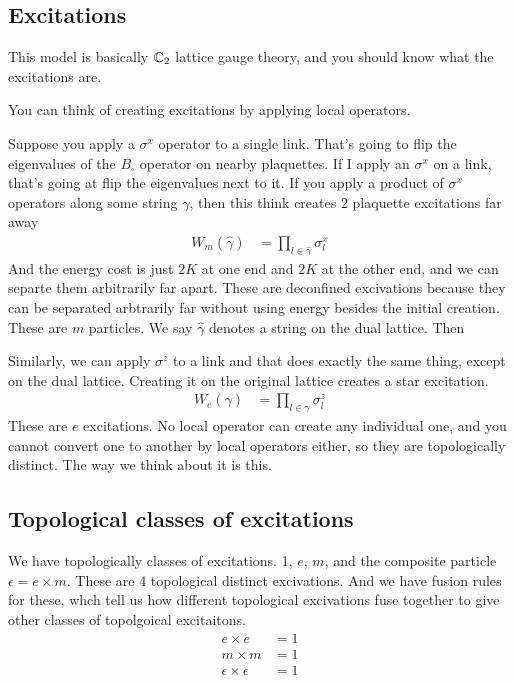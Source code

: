 \subsection{Excitations}
This model is basically $\mathbb{C}_2$ lattice gauge theory,
and you should know what the excitations are.

You can think of creating excitations by applying local operators.

Suppose you apply a $\sigma^x$ operator to a single link.
That's going to flip the eigenvalues of the $B_{\square}$ operator on nearby
plaquettes.
If I apply an $\sigma^x$ on a link,
that's going at flip the eigenvalues next to it.
If you apply a product of $\sigma^x$ operators along some string $\gamma$,
then this think creates $2$ plaquette excitations far away
\begin{align}
    W_m(\hat{\gamma}) &= \prod_{l\in \hat{\gamma}} \sigma_l^x
\end{align}
And the energy cost is just $2K$ at one end and $2K$ at the other end,
and we can separte them arbitrarily far apart.
These are deconfined excivations because they can be separated arbtrarily far
without using energy besides the initial creation.
These are $m$ particles.
We say $\hat{\gamma}$ denotes a string on the dual lattice.
Then

Similarly,
we can apply $\sigma^z$ to a link and that does exactly the same thing,
except on the dual lattice.
Creating it on the original lattice creates a star excitation.
\begin{align}
    W_e\left( \gamma \right)
    &=
    \prod_{l\in \gamma} \sigma_l^z
\end{align}
These are $e$ excitations.
No local operator can create any individual one,
and you cannot convert one to another by local operators either,
so they are topologically distinct.
The way we think about it is this.

\subsection{Topological classes of excitations}
We have topologically classes of excitations.
1, $e$, $m$, and the composite particle $\epsilon = e\times m$.
These are 4 topological distinct excivations.
And we have fusion rules for these,
whch tell us how different topological excivations fuse together to give other
classes of topolgoical excitaitons.
\begin{align}
    e\times e &= 1\\
    m\times m &= 1\\
    \epsilon \times \epsilon &= 1\\
\end{align}

